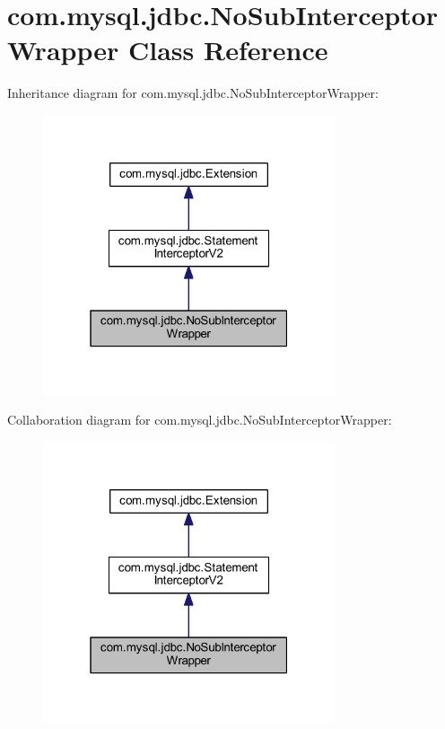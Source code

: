 \hypertarget{classcom_1_1mysql_1_1jdbc_1_1_no_sub_interceptor_wrapper}{}\section{com.\+mysql.\+jdbc.\+No\+Sub\+Interceptor\+Wrapper Class Reference}
\label{classcom_1_1mysql_1_1jdbc_1_1_no_sub_interceptor_wrapper}


Inheritance diagram for com.\+mysql.\+jdbc.\+No\+Sub\+Interceptor\+Wrapper\+:
\nopagebreak
\begin{figure}[H]
\begin{center}
\leavevmode
\includegraphics[width=244pt]{classcom_1_1mysql_1_1jdbc_1_1_no_sub_interceptor_wrapper__inherit__graph}
\end{center}
\end{figure}


Collaboration diagram for com.\+mysql.\+jdbc.\+No\+Sub\+Interceptor\+Wrapper\+:
\nopagebreak
\begin{figure}[H]
\begin{center}
\leavevmode
\includegraphics[width=244pt]{classcom_1_1mysql_1_1jdbc_1_1_no_sub_interceptor_wrapper__coll__graph}
\end{center}
\end{figure}
